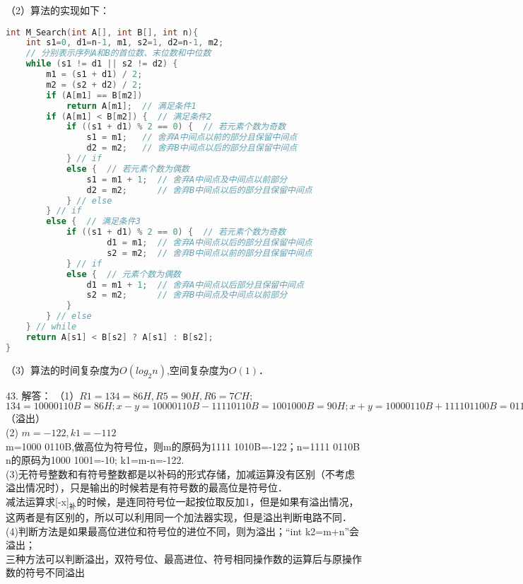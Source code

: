 （2）算法的实现如下：
\begin{lstlisting}[language=cpp]
int M_Search(int A[], int B[], int n){
    int s1=0, d1=n-1, m1, s2=1, d2=n-1, m2;
    // 分别表示序列A和B的首位数、末位数和中位数
    while (s1 != d1 || s2 != d2) {
        m1 = (s1 + d1) / 2;
        m2 = (s2 + d2) / 2;
        if (A[m1] == B[m2])
            return A[m1];  // 满足条件1
        if (A[m1] < B[m2]) {  // 满足条件2
            if ((s1 + d1) % 2 == 0) {  // 若元素个数为奇数
                s1 = m1;   // 舍弃A中间点以前的部分且保留中间点
                d2 = m2;   // 舍弃B中间点以后的部分且保留中间点
            } // if
            else {  // 若元素个数为偶数
                s1 = m1 + 1;  // 舍弃A中间点及中间点以前部分
                d2 = m2;      // 舍弃B中间点以后的部分且保留中间点
            } // else
        } // if
        else {  // 满足条件3
            if ((s1 + d1) % 2 == 0) {  // 若元素个数为奇数
                    d1 = m1;  // 舍弃A中间点以后的部分且保留中间点
                    s2 = m2;  // 舍弃B中间点以前的部分且保留中间点
            } // if
            else {  // 元素个数为偶数
                d1 = m1 + 1;  // 舍弃A中间点以后部分且保留中间点
                s2 = m2;      // 舍弃B中间点及中间点以前部分
            }
        } // else
    } // while
    return A[s1] < B[s2] ? A[s1] : B[s2];
}
\end{lstlisting}

（3）算法的时间复杂度为$O(log_2n)$,空间复杂度为$O(1)$．


43. 解答：
（1）$R1=134=86H, R5=90H, R6=7CH;$ \\
$134=1000 0110B=86H; x-y=1000 0110B-1111 0110B=1001 000B=90H; x+y=1000 0110B+1111 01100B=0111 1100B$（溢出） \\
(2) $m=-122, k1=-112$ \\
m=1000 0110B,做高位为符号位，则m的原码为1111 1010B=-122；n=1111 0110B \\
n的原码为1000 1001=-10; k1=m-n=-122. \\
(3)无符号整数和有符号整数都是以补码的形式存储，加减运算没有区别（不考虑溢出情况时），只是输出的时候若是有符号数的最高位是符号位． \\
减法运算求[-x]$_\text{补}$的时候，是连同符号位一起按位取反加1，但是如果有溢出情况，这两者是有区别的，所以可以利用同一个加法器实现，但是溢出判断电路不同． \\
(4)判断方法是如果最高位进位和符号位的进位不同，则为溢出；“int k2=m+n”会溢出； \\
三种方法可以判断溢出，双符号位、最高进位、符号相同操作数的运算后与原操作数的符号不同溢出

